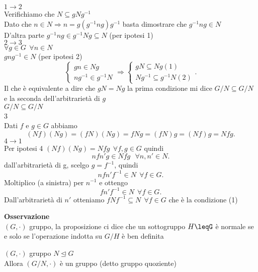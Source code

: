 \documentclass[12px]{article}
\begin{document}
{\begin{prop}
	\end{prop}
	\begin{dimo}
		$1 \rightarrow 2$\\
		Verifichiamo che $N\subseteq gNg^{-1}$\\
		Dato che  $n\in N \Rightarrow n = g(g^{-1}ng)g^{-1}$ basta dimostrare che $g^{-1}ng\in N$\\
		D'altra parte  $g^{-1}ng\in g^{-1}Ng\subseteq N$ (per ipotesi 1)\\
		$2 \rightarrow 3$\\
		$\forall g\in G \ \ \forall n\in N$\\
		$gng^{-1}\in N$ (per ipotesi 2)
		\[
		\begin{cases}
			gn\in Ng\\
			ng^{-1}\in g^{-1}N
		\end{cases} \Rightarrow \begin{cases}
			gN\subseteq Ng (1)\\
			Ng^{-1} \subseteq g^{-1}N (2)
		\end{cases}
		.\] 
		Il che è equivalente a dire che $gN = Ng$ la prima condizione mi dice $G/N\subseteq G/N$ e la seconda dell'arbitrarietà di  $g$\\
		 $G/N\subseteq G/N$\\
		 3  \\
		 Dati $f$ e $g\in G$ abbiamo
		 \[
			 (Nf)(Ng) = (fN)(Ng) = fNg = (fN)g = (Nf)g = Nfg
		 .\] 
		 $4 \rightarrow 1$\\
		 Per ipotesi 4 $(Nf)(Ng)=Nfg \ \ \forall f,g\in G$ quindi 
		  \[
		 nfn'g\in Nfg \ \ \ \forall n,n'\in N
		 .\] 
		 dall'arbitrarietà di g, scelgo $g=f^{-1}$, quindi 
		 \[
			 nfn'f^{-1}\in N \ \ \forall f\in G .\] 
			 Moltiplico (a sinistra) per $n^{-1}$ e ottengo\\
			 \[
				 fn'f^{-1}\in N \ \ \forall f\in G
			 .\] 
			 Dall'arbitrarietà di $n'$ otteniamo  $fNf^{-1}\subseteq N\ \ \forall f\in G$ che è la condizione (1) \\
	\end{dimo}
	\textbf{Osservazione}\\
	 $(G,\cdot)$ gruppo, la proposizione ci dice che un sottogruppo $H\leqG$ è normale se e solo se l'operazione indotta su $G/H$ è ben definita 
	 \begin{teo}
	 	$(G,\cdot)$ gruppo $N\trianglelefteq G$\\
		Allora $(G/N,\cdot)$ è un gruppo (detto gruppo quoziente)
	 \end{teo}
	 \begin{dimo}

\end{dimo}}
\end{document}
